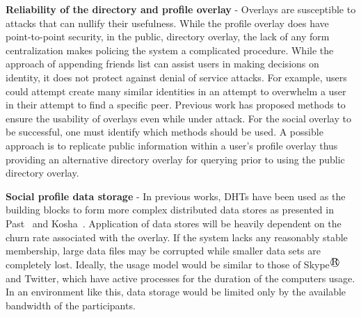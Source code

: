 {\bf Reliability of the directory and profile overlay} - Overlays are
susceptible to attacks that can nullify their usefulness.  While the profile
overlay does have point-to-point security, in the public, directory overlay,
the lack of any form centralization makes policing the system a complicated
procedure.  While the approach of appending friends list can assist users in
making decisions on identity, it does not protect against denial of service
attacks.  For example, users could attempt create many similar identities in an
attempt to overwhelm a user in their attempt to find a specific peer.  Previous
work has proposed methods to ensure the usability of overlays even while under
attack.  For the social overlay to be successful, one must identify which
methods should be used. A possible approach is to replicate public information
within a user's profile overlay thus providing an alternative directory overlay
for querying prior to using the public directory overlay.

{\bf Social profile data storage} - In previous works, DHTs have been used as
the building blocks to form more complex distributed data stores as presented
in Past~\cite{past} and Kosha~\cite{kosha}.  Application of data stores will be
heavily dependent on the churn rate associated with the overlay.  If the system
lacks any reasonably stable membership, large data files may be corrupted while
smaller data sets are completely lost.  Ideally, the usage model would be
similar to those of Skype$^\registered$ and Twitter, which have active processes for the
duration of the computers usage.  In an environment like this, data storage
would be limited only by the available bandwidth of the participants.
